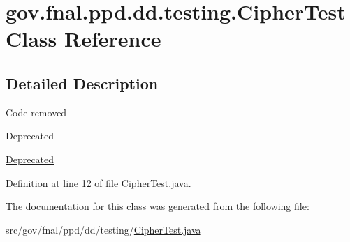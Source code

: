 \hypertarget{classgov_1_1fnal_1_1ppd_1_1dd_1_1testing_1_1CipherTest}{\section{gov.\-fnal.\-ppd.\-dd.\-testing.\-Cipher\-Test Class Reference}
\label{classgov_1_1fnal_1_1ppd_1_1dd_1_1testing_1_1CipherTest}
}


\subsection{Detailed Description}
Code removed \begin{DoxyRefDesc}{Deprecated}
\item[\hyperlink{deprecated__deprecated000004}{Deprecated}]\end{DoxyRefDesc}


Definition at line 12 of file Cipher\-Test.\-java.



The documentation for this class was generated from the following file\-:\begin{DoxyCompactItemize}
\item 
src/gov/fnal/ppd/dd/testing/\hyperlink{CipherTest_8java}{Cipher\-Test.\-java}\end{DoxyCompactItemize}
